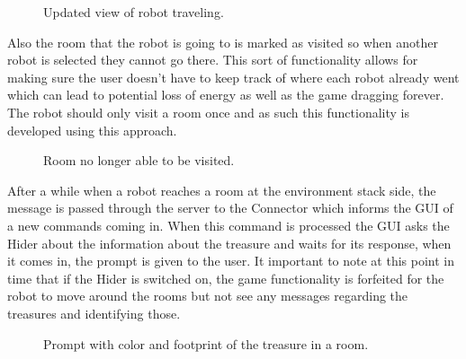       \begin{figure}[htp]
        \centering
        \caption{Updated view of robot traveling.}
      \end{figure}

      Also the room that the robot is going to is marked as visited so when another robot is selected they cannot go there. This sort of functionality allows for making sure the user doesn't have to keep track of where each robot already went which can lead to potential loss of energy as well as the game dragging forever. The robot should only visit a room once and as such this functionality is developed using this approach.

      \begin{figure}[htp]
        \centering
        \caption{Room no longer able to be visited.}
      \end{figure}

      After a while when a robot reaches a room at the environment stack side, the message is passed through the server to the Connector which informs the GUI of a new commands coming in. When this command is processed the GUI asks the Hider about the information about the treasure and waits for its response, when it comes in, the prompt is given to the user. It important to note at this point in time that if the Hider is switched on, the game functionality is forfeited for the robot to move around the rooms but not see any messages regarding the treasures and identifying those.

      \begin{figure}[htp]
        \centering
        \caption{Prompt with color and footprint of the treasure in a room.}
      \end{figure}

